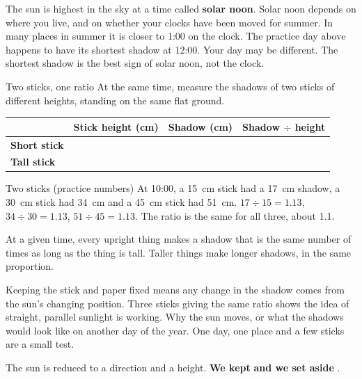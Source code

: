 The sun is highest in the sky at a time called \textbf{solar noon}. Solar noon depends on where you live, and on whether your clocks have been moved for summer. In many places in summer it is closer to 1:00 on the clock. The practice day above happens to have its shortest shadow at 12:00. Your day may be different. The shortest shadow is the best sign of solar noon, not the clock.

\begin{tryit}{Two sticks, one ratio}
At the same time, measure the shadows of two sticks of different heights, standing on the same flat ground.\par\medskip
\renewcommand{\arraystretch}{1.6}
\begin{tabular}{|l|c|c|c|}
\hline
 & \textbf{Stick height (cm)} & \textbf{Shadow (cm)} & \textbf{Shadow $\div$ height}\\ \hline
\textbf{Short stick} & & & \\ \hline
\textbf{Tall stick} & & & \\ \hline
\end{tabular}
\end{tryit}

\begin{worked}{Two sticks (practice numbers)}
At 10:00, a 15~cm stick had a 17~cm shadow, a 30~cm stick had 34~cm and a 45~cm stick had 51~cm. $17\div15=1.13$, $34\div30=1.13$, $51\div45=1.13$. The ratio is the same for all three, about 1.1.
\end{worked}

At a given time, every upright thing makes a shadow that is the same number of times as long as the thing is tall. Taller things make longer shadows, in the same proportion.

{Keeping the stick and paper fixed means any change in the shadow comes from the sun's changing position. Three sticks giving the same ratio shows the idea of straight, parallel sunlight is working.}
{Why the sun moves, or what the shadows would look like on another day of the year. One day, one place and a few sticks are a small test.}

\begin{keepbox}
The sun is reduced to a direction and a height. \textbf{We kept} \wline[3.4cm] \textbf{and we set aside} \wline[3.4cm].
\end{keepbox}

